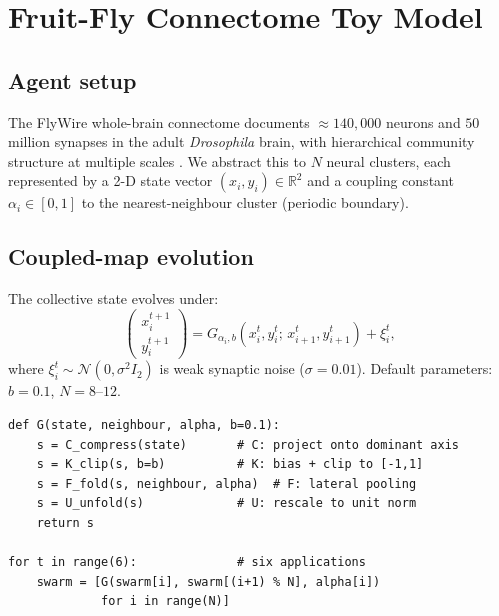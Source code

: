 \documentclass[12pt,a4paper]{article}
\begin{document}
\section{Fruit-Fly Connectome Toy Model}
\label{sec:model}

\subsection{Agent setup}

The FlyWire whole-brain connectome \cite{Dorkenwald2024} documents
${\approx}140{,}000$ neurons and $50$ million synapses in the adult
\textit{Drosophila} brain, with hierarchical community structure at
multiple scales \cite{Schlegel2024}.  We abstract this to $N$ neural
clusters, each represented by a 2-D state vector
$(x_{i},y_{i})\in\mathbb{R}^{2}$ and a coupling constant
$\alpha_{i}\in[0,1]$ to the nearest-neighbour cluster (periodic
boundary).

\subsection{Coupled-map evolution}

The collective state evolves under:
\begin{equation}
\begin{pmatrix}x_{i}^{t+1}\\y_{i}^{t+1}\end{pmatrix}
= G_{\alpha_{i},b}\!\left(x_{i}^{t},y_{i}^{t};\,
  x_{i+1}^{t},y_{i+1}^{t}\right)+\xi_{i}^{t},
\label{eq:map}
\end{equation}
where $\xi_{i}^{t}\sim\mathcal{N}(0,\sigma^{2}I_{2})$ is weak
synaptic noise ($\sigma=0.01$).  Default parameters: $b=0.1$,
$N=8$--$12$.

\begin{lstlisting}[caption={Coupled-map evolution (from
\texttt{multi\_orbit\_bioswarm.py}).},label={lst:py}]
def G(state, neighbour, alpha, b=0.1):
    s = C_compress(state)       # C: project onto dominant axis
    s = K_clip(s, b=b)          # K: bias + clip to [-1,1]
    s = F_fold(s, neighbour, alpha)  # F: lateral pooling
    s = U_unfold(s)             # U: rescale to unit norm
    return s

for t in range(6):              # six applications
    swarm = [G(swarm[i], swarm[(i+1) % N], alpha[i])
             for i in range(N)]
\end{lstlisting}
\end{document}
